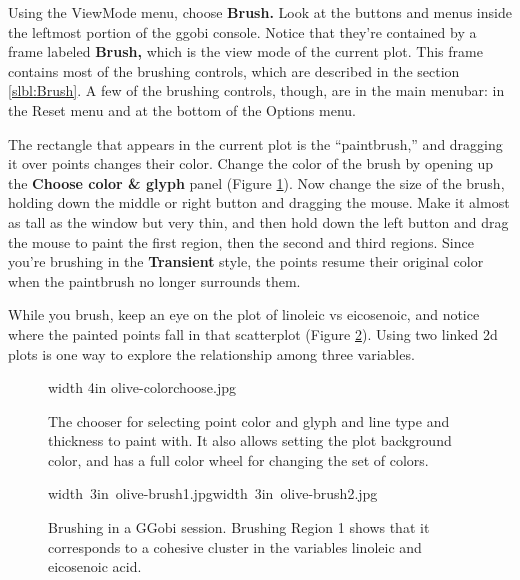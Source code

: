 \documentclass[11pt]{article}
\begin{document}
Using the ViewMode menu, choose {\bf Brush.}  Look at the buttons and
menus inside the leftmost portion of the ggobi console.  Notice
that they're contained by a frame labeled {\bf Brush,} which is the
view mode of the current plot.  This frame contains most of the
brushing controls, which are described in the section
\ref{slbl:Brush}.  A few of the brushing controls, though, are in the
main menubar: in the Reset menu and at the bottom of the Options menu.

The rectangle that appears in the current plot is the ``paintbrush,''
and dragging it over points changes their color. Change the color of
the brush by opening up the {\bf Choose color \& glyph} panel (Figure
\ref{fig2}). Now change the size of the brush, holding down the
middle or right button and dragging the mouse.  Make it almost as
tall as the window but very thin, and then hold down the left button
and drag the mouse to  paint the first region, then the second and
third regions.  Since you're brushing in the {\bf Transient} style,
the points resume their original color when the paintbrush no longer
surrounds them.

While you brush, keep an eye on the plot of linoleic vs eicosenoic,
and notice where the painted points fall in that scatterplot (Figure
\ref{fig3}).  Using two linked 2d plots is one way to explore the
relationship among three variables.

\begin{figure}[htp]
\vspace{-0.5in}
\pdfimage width 4in {olive-colorchoose.jpg}
\caption{The chooser for selecting point color and glyph and line
type and thickness to paint with. It also allows setting the plot
background color, and has a full color wheel for changing the set of
colors.
}%
\label{fig2}
\end{figure}

\begin{figure}[htp]
\hbox{\pdfimage width 3in {olive-brush1.jpg}\pdfimage width 3in {olive-brush2.jpg}}
\caption{Brushing in a GGobi session. Brushing Region 1 shows that it
corresponds to a cohesive cluster in the variables linoleic and 
eicosenoic acid.
}%
\label{fig3}
\end{figure}
\end{document}
